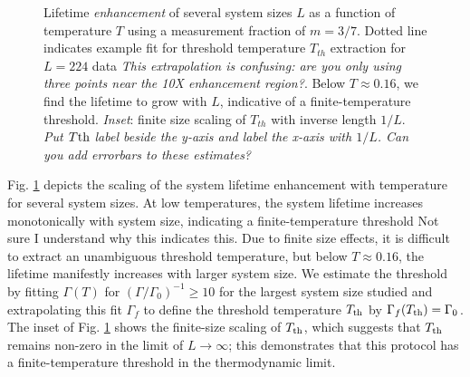 \documentclass[twocolumn,superscriptaddress,aps,prb,floatfix]{revtex4-1}
\newcommand{\figref}[1]{Fig. \ref{#1}}
\newcommand{\CMH}[1]{{\color{green} { #1}}}
\newcommand{\MS}[1]{{\color{mauve} {#1}}}
\begin{document}
\begin{figure}
\begin{center}
\end{center}
\caption{Lifetime {\it enhancement} of several system sizes $L$ as a function of temperature $T$ using a measurement fraction of $m=3/7$.  Dotted line indicates example fit for threshold temperature $T_{th}$ extraction for $L=224$ data \CMH{\it{This extrapolation is confusing: are you only using three points near the 10X enhancement region?}}.  Below $T\approx0.16$, we find the lifetime to grow with $L$, indicative of a finite-temperature threshold. {\it Inset}: finite size scaling of $T_{th}$ with inverse length $1/L$. \CMH{\it{Put $T{\rm{th}}$ label beside the y-axis and label the x-axis with $1/L$. Can you add errorbars to these estimates?}}}
\label{fig:LifetimeVsTemperature}
\end{figure}

\figref{fig:LifetimeVsTemperature} depicts the scaling of the system lifetime enhancement with temperature for several system sizes.  At low temperatures, the system lifetime increases monotonically with system size, indicating a finite-temperature threshold \MS{Not sure I understand why this indicates this}.  Due to finite size effects, it is difficult to extract an unambiguous threshold temperature, but below $T\approx0.16$, the lifetime manifestly increases with larger system size.  We estimate the threshold by fitting $\Gamma(T)$ for $(\Gamma/\Gamma_0)^{-1} \geq 10$ for the largest system size studied and extrapolating this fit $\Gamma_f$ to define the threshold temperature $T_{\rm{th}}$ by $\Gamma_f(T_{\rm{th}}) = \Gamma_0$. \CMH{ The inset of \figref{fig:LifetimeVsTemperature} shows the finite-size scaling of $T_{\rm{th}}$, which suggests that $T_{\rm{th}}$ remains non-zero in the limit of $L\rightarrow \infty$; this demonstrates that this protocol has a finite-temperature threshold in the thermodynamic limit.}
\end{document}
